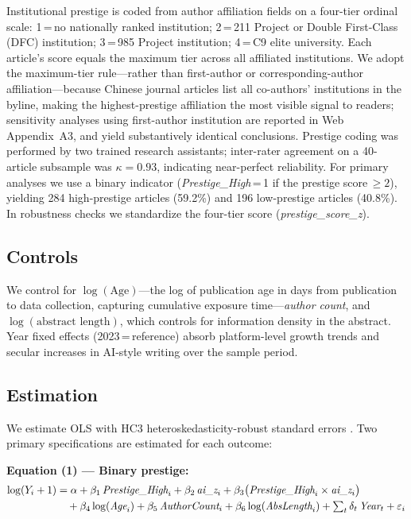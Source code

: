 \documentclass[12pt,a4paper]{article}
\begin{document}
Institutional prestige is coded from author affiliation fields on a
four-tier ordinal scale: 1\,=\,no nationally ranked institution;
2\,=\,211 Project or Double First-Class (DFC) institution;
3\,=\,985 Project institution; 4\,=\,C9 elite university.
Each article's score equals the maximum tier across all affiliated
institutions.
We adopt the maximum-tier rule---rather than first-author or
corresponding-author affiliation---because Chinese journal articles
list all co-authors' institutions in the byline, making the
highest-prestige affiliation the most visible signal to readers;
sensitivity analyses using first-author institution are reported in
Web Appendix~A3, and yield substantively identical conclusions.
Prestige coding was performed by two trained research assistants;
inter-rater agreement on a 40-article subsample was
$\kappa = 0.93$, indicating near-perfect reliability.
For primary analyses we use a binary indicator
(\textit{Prestige\_High}\,=\,1 if the prestige score\,$\geq 2$),
yielding 284 high-prestige articles (59.2\%) and 196 low-prestige
articles (40.8\%).
In robustness checks we standardize the four-tier score
(\textit{prestige\_score\_z}).

\subsection{Controls}

We control for $\log(\text{Age})$---the log of publication age in
days from publication to data collection, capturing cumulative
exposure time---\textit{author count}, and $\log(\text{abstract length})$,
which controls for information density in the abstract.
Year fixed effects (2023\,=\,reference) absorb platform-level growth
trends and secular increases in AI-style writing over the sample period.

\subsection{Estimation}

We estimate OLS with HC3 heteroskedasticity-robust standard errors
\citep{MacKinnon1985}.
Two primary specifications are estimated for each outcome:

\noindent\textbf{Equation (1) --- Binary prestige:}
\begin{align}
\log(Y_i+1) &= \alpha
  + \beta_1\,\textit{Prestige\_High}_i
  + \beta_2\,\textit{ai\_z}_i
  + \beta_3\bigl(\textit{Prestige\_High}_i\times\textit{ai\_z}_i\bigr)
  \notag\\
  &\quad
  + \beta_4\log(\textit{Age}_i)
  + \beta_5\,\textit{AuthorCount}_i
  + \beta_6\log(\textit{AbsLength}_i)
  + \textstyle\sum_{t}\delta_t\,\textit{Year}_t
  + \varepsilon_i
\label{eq:binary}
\end{align}
\end{document}
